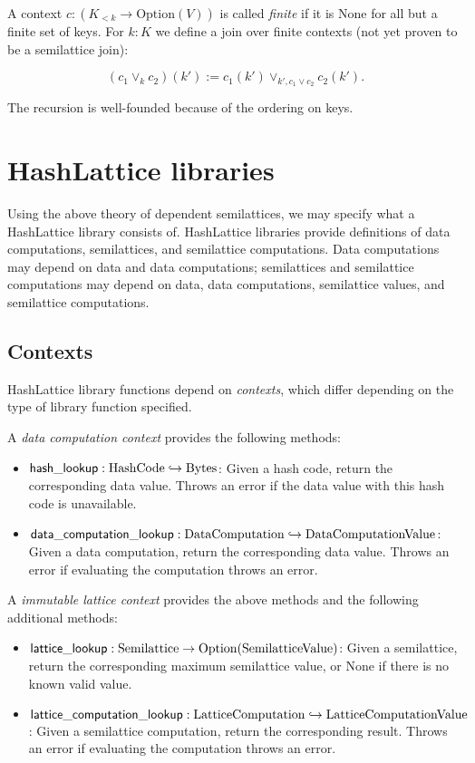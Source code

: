 \documentclass{article}
\begin{document}
      A context $c : (K_{<k} \to \mathrm{Option}(V))$ is called \emph{finite} if it is $\mathrm{None}$ for all but a finite set of keys. For $k : K$ we define a join over finite contexts (not yet proven to be a semilattice join):

      $$ (c_1 \vee_k c_2)(k') := c_1(k') \vee_{k', c_1 \vee c_2} c_2(k').$$

      The recursion is well-founded because of the ordering on keys.

  \section{HashLattice libraries}

    Using the above theory of dependent semilattices, we may specify what a HashLattice library consists of. HashLattice libraries provide definitions of data computations, semilattices, and semilattice computations. Data computations may depend on data and data computations; semilattices and semilattice computations may depend on data, data computations, semilattice values, and semilattice computations.

    \subsection{Contexts}

      HashLattice library functions depend on \emph{contexts}, which differ depending on the type of library function specified.

      A \emph{data computation context} provides the following methods:


      \begin{itemize}
        \item $\mathsf{hash\_lookup} : \mathrm{HashCode} \hookrightarrow \mathrm{Bytes}$: Given a hash code, return the corresponding data value. Throws an error if the data value with this hash code is unavailable.
        \item $\mathsf{data\_computation\_lookup} : \mathrm{DataComputation} \hookrightarrow \mathrm{DataComputationValue}$: Given a data computation, return the corresponding data value. Throws an error if evaluating the computation throws an error.
      \end{itemize}

      A \emph{immutable lattice context} provides the above methods and the following additional methods:


      \begin{itemize}
        \item $\mathsf{lattice\_lookup} : \mathrm{Semilattice} \to \mathrm{Option}(\mathrm{SemilatticeValue})$: Given a semilattice, return the corresponding maximum semilattice value, or $\mathrm{None}$ if there is no known valid value.
        \item $\mathsf{lattice\_computation\_lookup} : \mathrm{LatticeComputation} \hookrightarrow \mathrm{LatticeComputationValue}$: Given a semilattice computation, return the corresponding result. Throws an error if evaluating the computation throws an error.
      \end{itemize}
\end{document}
